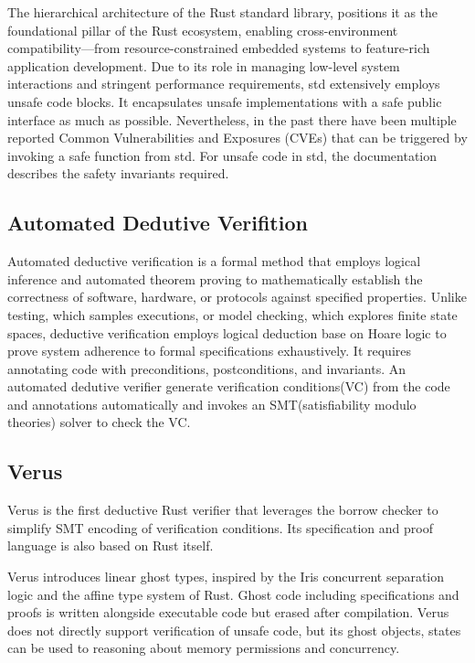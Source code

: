 \documentclass[conference]{IEEEtran}
\begin{document}
The hierarchical architecture of the Rust standard library, positions it as the foundational pillar of the Rust ecosystem, enabling cross-environment compatibility—from resource-constrained embedded systems to feature-rich application development. Due to its role in managing low-level system interactions and stringent performance requirements, std extensively employs unsafe code blocks. It encapsulates unsafe implementations with a safe public interface as much as possible. Nevertheless, in the past there have been multiple reported Common Vulnerabilities and Exposures (CVEs)\cite{Qwaz_rust-cve} that can be triggered by invoking a safe function from std. For unsafe code in std, the documentation describes the safety invariants required.   

\subsection{Automated Dedutive Verifition}
Automated deductive verification is a formal method that employs logical inference and automated theorem proving to mathematically establish the correctness of software, hardware, or protocols against specified properties. Unlike testing, which samples executions, or model checking, which explores finite state spaces, deductive verification employs logical deduction base on Hoare logic to prove system adherence to formal specifications exhaustively. It requires annotating code with preconditions, postconditions, and invariants. An automated dedutive verifier generate verification conditions(VC) from the code and annotations automatically and invokes an SMT(satisfiability modulo theories) solver to check the VC.

\subsection{Verus}
Verus\cite{verus} is the first deductive Rust verifier that leverages the borrow checker to simplify SMT encoding of verification conditions. Its specification and proof language is also based on Rust itself. 

Verus introduces linear ghost types, inspired by the Iris concurrent separation logic\cite{Iris_contributors_Iris} and the affine type system of Rust. Ghost code including specifications and proofs is written alongside executable code but erased after compilation. Verus does not directly support verification of unsafe code, but its ghost objects, states can be used to reasoning about memory permissions and concurrency.  
\end{document}
